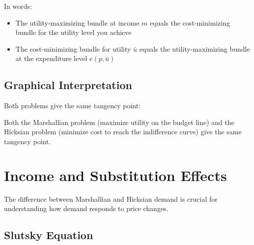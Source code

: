 \documentclass[11pt]{article}
\begin{document}
In words:
\begin{itemize}
    \item The utility-maximizing bundle at income $m$ equals the cost-minimizing bundle for the utility level you achieve
    \item The cost-minimizing bundle for utility $\bar{u}$ equals the utility-maximizing bundle at the expenditure level $e(p, \bar{u})$
\end{itemize}

\subsection{Graphical Interpretation}

Both problems give the same tangency point:

\begin{center}
\end{center}

Both the Marshallian problem (maximize utility on the budget line) and the Hicksian problem (minimize cost to reach the indifference curve) give the same tangency point.

\section{Income and Substitution Effects}

The difference between Marshallian and Hicksian demand is crucial for understanding how demand responds to price changes.

\subsection{Slutsky Equation}
\end{document}
